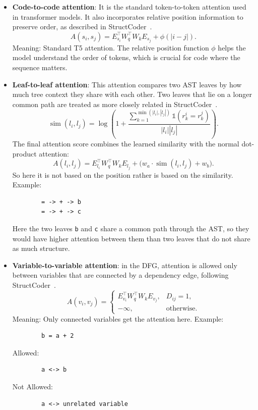 \documentclass[12pt]{article}
\begin{document}
\begin{itemize}
	\item \textbf{Code-to-code attention}: It is the standard token-to-token attention used in transformer models. It also incorporates relative position information to preserve order, as described in StructCoder~\cite{10.1145/3636430}.
	\begin{equation}
	A(s_i, s_j) = E_{s_i}^{\top} W_q^{\top} W_k E_{s_j} + \phi(|i-j|).
	\end{equation}
	Meaning:
	Standard T5 attention. The relative position function $\phi$ helps the model understand the order of tokens, which is crucial for code where the sequence matters.


	\item \textbf{Leaf-to-leaf attention}: This attention compares two AST leaves by how much tree context they share with each other. Two leaves that lie on a longer common path are treated as more closely related in StructCoder~\cite{10.1145/3636430}.
	\begin{equation}
	\operatorname{sim}(l_i, l_j) = \log\!\left(1 + \frac{\sum_{k=1}^{\min(|l_i|,|l_j|)} \mathbb{1}(r_k^i = r_k^j)}{|l_i||l_j|}\right).
	\end{equation}
	The final attention score combines the learned similarity with the normal dot-product attention:
	\begin{equation}
	A(l_i, l_j) = E_{l_i}^{\top} W_q^{\top} W_k E_{l_j} + \bigl(w_a \cdot \operatorname{sim}(l_i, l_j) + w_b\bigr).
	\end{equation}
	So here it is not based on the position rather is based on the similarity.
	Example:
	\begin{lstlisting}
		= -> + -> b
		= -> + -> c
	\end{lstlisting}
	Here the two leaves \texttt{b} and \texttt{c} share a common path through the AST, so they would have higher attention between them than two leaves that do not share as much structure.

	\item \textbf{Variable-to-variable attention}: in the DFG, attention is allowed only between variables that are connected by a dependency edge, following StructCoder~\cite{10.1145/3636430}.
	\begin{equation}
	A(v_i, v_j) =
	\begin{cases}
	E_{v_i}^{\top} W_q^{\top} W_k E_{v_j}, & D_{ij} = 1, \\
	-\infty, & \text{otherwise}.
	\end{cases}
	\end{equation}
	Meaning:
	Only connected variables get the attention here. 
	Example:
	\begin{lstlisting}
		b = a + 2
	\end{lstlisting}
	Allowed: 
	\begin{lstlisting}
		a <-> b
	\end{lstlisting}
	Not Allowed: 
	\begin{lstlisting}
		a <-> unrelated variable
	\end{lstlisting}


\end{itemize}
\end{document}
